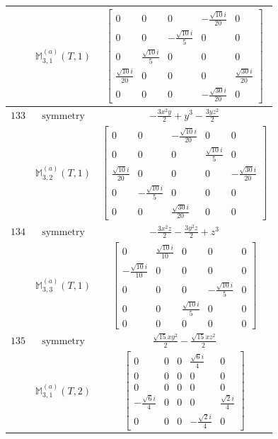 \documentclass[fleqn,8pt,landscape]{jsarticle}
\begin{document}
\begin{longtable}{ccc}
$  $ & $ \mathbb{M}_{3,1}^{(a)}(T,1) $ & $ \begin{bmatrix} 0 & 0 & 0 & - \frac{\sqrt{10} i}{20} & 0 \\ 0 & 0 & - \frac{\sqrt{10} i}{5} & 0 & 0 \\ 0 & \frac{\sqrt{10} i}{5} & 0 & 0 & 0 \\ \frac{\sqrt{10} i}{20} & 0 & 0 & 0 & \frac{\sqrt{30} i}{20} \\ 0 & 0 & 0 & - \frac{\sqrt{30} i}{20} & 0 \end{bmatrix} $ \\ \hline
$ 133 $ & $ \text{symmetry} $ & $ - \frac{3 x^{2} y}{2} + y^{3} - \frac{3 y z^{2}}{2} $ \\
$  $ & $ \mathbb{M}_{3,2}^{(a)}(T,1) $ & $ \begin{bmatrix} 0 & 0 & - \frac{\sqrt{10} i}{20} & 0 & 0 \\ 0 & 0 & 0 & \frac{\sqrt{10} i}{5} & 0 \\ \frac{\sqrt{10} i}{20} & 0 & 0 & 0 & - \frac{\sqrt{30} i}{20} \\ 0 & - \frac{\sqrt{10} i}{5} & 0 & 0 & 0 \\ 0 & 0 & \frac{\sqrt{30} i}{20} & 0 & 0 \end{bmatrix} $ \\ \hline
$ 134 $ & $ \text{symmetry} $ & $ - \frac{3 x^{2} z}{2} - \frac{3 y^{2} z}{2} + z^{3} $ \\
$  $ & $ \mathbb{M}_{3,3}^{(a)}(T,1) $ & $ \begin{bmatrix} 0 & \frac{\sqrt{10} i}{10} & 0 & 0 & 0 \\ - \frac{\sqrt{10} i}{10} & 0 & 0 & 0 & 0 \\ 0 & 0 & 0 & - \frac{\sqrt{10} i}{5} & 0 \\ 0 & 0 & \frac{\sqrt{10} i}{5} & 0 & 0 \\ 0 & 0 & 0 & 0 & 0 \end{bmatrix} $ \\ \hline
$ 135 $ & $ \text{symmetry} $ & $ \frac{\sqrt{15} x y^{2}}{2} - \frac{\sqrt{15} x z^{2}}{2} $ \\
$  $ & $ \mathbb{M}_{3,1}^{(a)}(T,2) $ & $ \begin{bmatrix} 0 & 0 & 0 & \frac{\sqrt{6} i}{4} & 0 \\ 0 & 0 & 0 & 0 & 0 \\ 0 & 0 & 0 & 0 & 0 \\ - \frac{\sqrt{6} i}{4} & 0 & 0 & 0 & \frac{\sqrt{2} i}{4} \\ 0 & 0 & 0 & - \frac{\sqrt{2} i}{4} & 0 \end{bmatrix} $ \\ \hline

\end{longtable}
\end{document}
